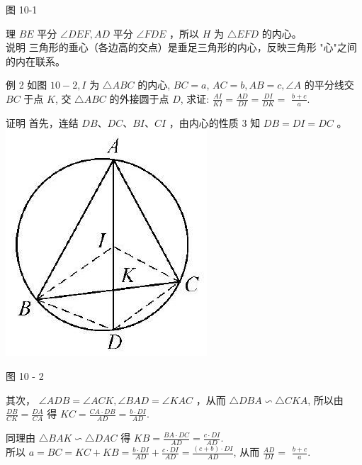 \documentclass[10pt]{article}
\begin{document}
图 10-1

理 $B E$ 平分 $\angle D E F, A D$ 平分 $\angle F D E$ ，所以 $H$ 为 $\triangle E F D$ 的内心。\\
说明 三角形的垂心（各边高的交点）是垂足三角形的内心，反映三角形 "心"之间的内在联系。

例 2 如图 $10-2, I$ 为 $\triangle A B C$ 的内心, $B C=a$, $A C=b, A B=c, \angle A$ 的平分线交 $B C$ 于点 $K$, 交 $\triangle A B C$ 的外接圆于点 $D$, 求证: $\frac{A I}{K I}=\frac{A D}{D I}=\frac{D I}{D K}=$ $\frac{b+c}{a}$.

证明 首先，连结 $D B 、 D C 、 B I 、 C I$ ，由内心的性质 3 知 $D B=D I=D C$ 。\\
\includegraphics[max width=\textwidth, center]{2024_10_30_66b8e5e701da2093c133g-072}

图 10 - 2

其次， $\angle A D B=\angle A C K, \angle B A D=\angle K A C$ ，从而 $\triangle D B A \backsim \triangle C K A$, 所以由 $\frac{D B}{C K}=\frac{D A}{C A}$ 得 $K C=\frac{C A \cdot D B}{A D}=\frac{b \cdot D I}{A D}$.

同理由 $\triangle B A K \backsim \triangle D A C$ 得 $K B=\frac{B A \cdot D C}{A D}=\frac{c \cdot D I}{A D}$.\\
所以 $a=B C=K C+K B=\frac{b \cdot D I}{A D}+\frac{c \cdot D I}{A D}=\frac{(c+b) \cdot D I}{A D}$, 从而 $\frac{A D}{D I}=$ $\frac{b+c}{a}$.
\end{document}

